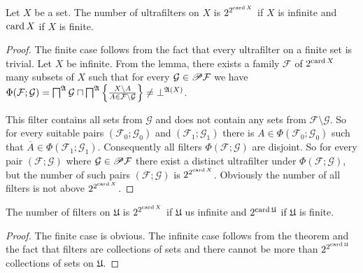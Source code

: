 \begin{thm}
Let $X$ be a set. The number of ultrafilters on $X$ is $2^{2^{\operatorname{card} X}}$
if $X$ is infinite and $\operatorname{card} X$ if $X$ is finite.\end{thm}
\begin{proof}
The finite case follows from the fact that every ultrafilter on a
finite set is trivial. Let $X$ be infinite. From the lemma, there
exists a family $\mathcal{F}$ of $2^{\operatorname{card} X}$ many subsets of $X$
such that for every $\mathcal{G}\in\mathscr{P}\mathcal{F}$ we have $\Phi(\mathcal{F};\mathcal{G})=\bigsqcap^{\mathfrak{A}}\mathcal{G}\sqcap\bigsqcap^{\mathfrak{A}}\left\{ \frac{X\setminus A}{A\in\mathcal{F}\setminus\mathcal{G}}\right\}\ne\bot^{\mathfrak{A}(X)}$.

This filter contains all sets from $\mathcal{G}$ and does not contain
any sets from $\mathcal{F}\setminus\mathcal{G}$. So for every suitable
pairs $(\mathcal{F}_{0};\mathcal{G}_{0})$ and $(\mathcal{F}_{1};\mathcal{G}_{1})$
there is $A\in\Phi(\mathcal{F}_{0};\mathcal{G}_{0})$ such that $\overline{A}\in\Phi(\mathcal{F}_{1};\mathcal{G}_{1})$.
Consequently all filters $\Phi(\mathcal{F};\mathcal{G})$ are disjoint.
So for every pair $(\mathcal{F};\mathcal{G})$ where $\mathcal{G}\in\mathscr{P}\mathcal{F}$
there exist a distinct ultrafilter under $\Phi(\mathcal{F};\mathcal{G})$,
but the number of such pairs $(\mathcal{F};\mathcal{G})$ is $2^{2^{\operatorname{card} X}}$.
Obviously the number of all filters is not above $2^{2^{\operatorname{card} X}}$.\end{proof}
\begin{cor}
The number of filters on $\mathfrak{U}$ is $2^{2^{\operatorname{card} X}}$ if
$\mathfrak{U}$ us infinite and $2^{\operatorname{card}\mathfrak{U}}$ if $\mathfrak{U}$
is finite.\end{cor}
\begin{proof}
The finite case is obvious. The infinite case follows from the theorem
and the fact that filters are collections of sets and there cannot
be more than $2^{2^{\operatorname{card}\mathfrak{U}}}$ collections of sets on $\mathfrak{U}$.
\end{proof}

